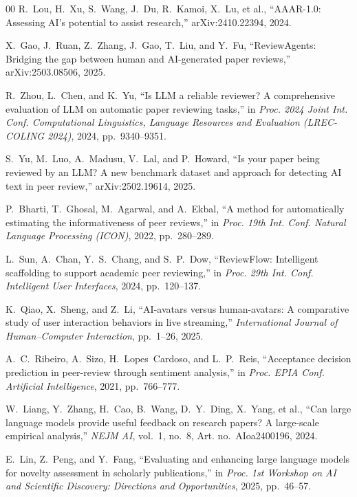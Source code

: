 \documentclass[preprint,10pt,times]{elsarticle}
\begin{document}
\begin{thebibliography}{00}
R.~Lou, H.~Xu, S.~Wang, J.~Du, R.~Kamoi, X.~Lu, et al.,
``AAAR-1.0: Assessing AI's potential to assist research,''
arXiv:2410.22394, 2024.

X.~Gao, J.~Ruan, Z.~Zhang, J.~Gao, T.~Liu, and Y.~Fu,
``ReviewAgents: Bridging the gap between human and AI-generated paper reviews,''
arXiv:2503.08506, 2025.

R.~Zhou, L.~Chen, and K.~Yu,
``Is LLM a reliable reviewer? A comprehensive evaluation of LLM on automatic paper reviewing tasks,''
in \textit{Proc. 2024 Joint Int. Conf. Computational Linguistics, Language Resources and Evaluation (LREC-COLING 2024)}, 2024, pp.~9340--9351.

S.~Yu, M.~Luo, A.~Madusu, V.~Lal, and P.~Howard,
``Is your paper being reviewed by an LLM? A new benchmark dataset and approach for detecting AI text in peer review,''
arXiv:2502.19614, 2025.

P.~Bharti, T.~Ghosal, M.~Agarwal, and A.~Ekbal,
``A method for automatically estimating the informativeness of peer reviews,''
in \textit{Proc. 19th Int. Conf. Natural Language Processing (ICON)}, 2022, pp.~280--289.

L.~Sun, A.~Chan, Y.~S.~Chang, and S.~P.~Dow,
``ReviewFlow: Intelligent scaffolding to support academic peer reviewing,''
in \textit{Proc. 29th Int. Conf. Intelligent User Interfaces}, 2024, pp.~120--137.

K.~Qiao, X.~Sheng, and Z.~Li,
``AI-avatars versus human-avatars: A comparative study of user interaction behaviors in live streaming,''
\textit{International Journal of Human--Computer Interaction}, pp.~1--26, 2025.

A.~C.~Ribeiro, A.~Sizo, H.~Lopes~Cardoso, and L.~P.~Reis,
``Acceptance decision prediction in peer-review through sentiment analysis,''
in \textit{Proc. EPIA Conf. Artificial Intelligence}, 2021, pp.~766--777.

W.~Liang, Y.~Zhang, H.~Cao, B.~Wang, D.~Y.~Ding, X.~Yang, et al.,
``Can large language models provide useful feedback on research papers? A large-scale empirical analysis,''
\textit{NEJM AI}, vol.~1, no.~8, Art. no.~AIoa2400196, 2024.

E.~Lin, Z.~Peng, and Y.~Fang,
``Evaluating and enhancing large language models for novelty assessment in scholarly publications,''
in \textit{Proc. 1st Workshop on AI and Scientific Discovery: Directions and Opportunities}, 2025, pp.~46--57.


\end{thebibliography}
\end{document}
